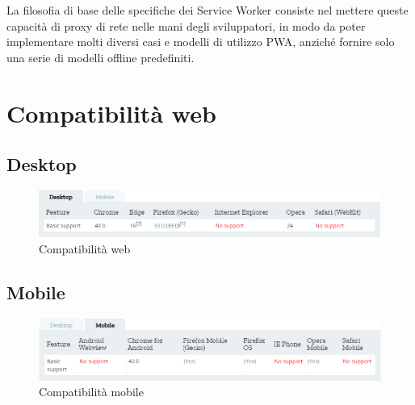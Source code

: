 \documentclass[italian]{article}
\begin{document}
La filosofia di base delle specifiche dei Service Worker consiste nel mettere queste capacità di proxy di rete nelle mani degli sviluppatori, in modo da poter implementare molti diversi casi e modelli di utilizzo PWA, anziché fornire solo una serie di modelli offline predefiniti.
\pagebreak
\section{Compatibilità web}
\subsection{Desktop}
\begin{figure}[h]
	\centering
	\includegraphics[width=1\linewidth]{CompWeb}
	\caption{Compatibilità web}
	\label{fig:Compatibilità web}
\end{figure}
\subsection{Mobile}
\begin{figure}[h]
	\centering
	\includegraphics[width=1\linewidth]{CompMobile}
	\caption{Compatibilità mobile}
	\label{fig:Compatibilità mobile}
\end{figure}
\end{document}
